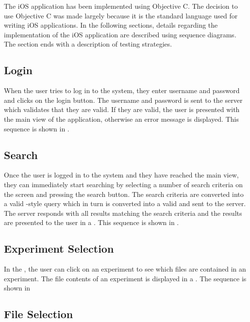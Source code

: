 The iOS application has been implemented using Objective C. The decision to use Objective C was made largely because it is the standard language used for writing iOS applications.
In the following sections, details regarding the implementation of the iOS application are described using sequence diagrams. The section ends with a description of testing strategies.

\subsection{Login}

When the user tries to log in to the system, they enter username and password and clicks on the login button. The username and password is sent to the server which validates that they are valid. If they are valid, the user is presented with the main view of the application, otherwise an error message is displayed. This sequence is shown in .


\subsection{Search}

Once the user is logged in to the system and they have reached the main view, they can immediately start searching by selecting a number of search criteria on the screen and pressing the search button. The search criteria are converted into a valid -style query which in turn is converted into a valid  and sent to the server. The server responds with all results matching the search criteria and the results are presented to the user in a . This sequence is shown in .


\subsection{Experiment Selection}

In the , the user can click on an experiment to see which files are contained in an experiment. The file contents of an experiment is displayed in a . The sequence is shown in  


\subsection{File Selection}

